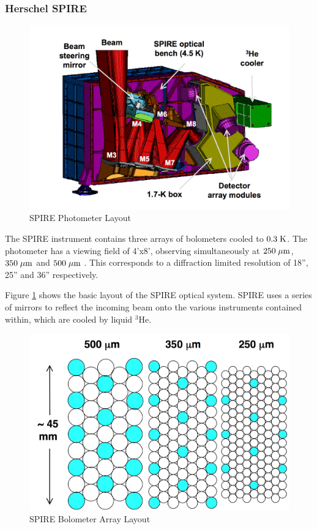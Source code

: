 \subsubsection{Herschel SPIRE}

\begin{figure}[H]
    \centering
    \includegraphics[width=0.8\linewidth]{figures/spire.png}
    \caption[SPIRE Photometer Layout]{SPIRE Photometer Layout \citep{griffin2010herschel}}
    \label{spire-schematic}
\end{figure}

The SPIRE instrument contains three arrays of bolometers cooled to $0.3\;\mathrm{K}$. The photometer has a viewing field of 4'x8', observing simultaneously at $250\;\mathrm{\mu m}$, $350\;\mathrm{\mu m}$ and $500\;\mathrm{\mu m}$ \citep{griffin2010herschel}. This corresponds to a diffraction limited resolution of 18'', 25'' and 36'' respectively.

Figure \ref{spire-schematic} shows the basic layout of the SPIRE optical system. SPIRE uses a series of mirrors to reflect the incoming beam onto the various instruments contained within, which are cooled by liquid $^3$He.

\begin{figure}[H]
    \centering
    \includegraphics[width=0.8\linewidth]{figures/bolometer-layout.png}
    \caption[SPIRE Bolometer Array Layout]{SPIRE Bolometer Array Layout \citep{griffin2010herschel}}
    \label{spire-bolometer}
\end{figure}


